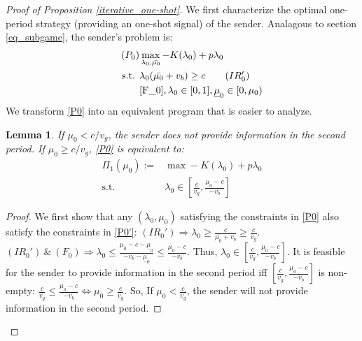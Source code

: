 \documentclass[11pt]{extarticle}
\newtheorem{lemma}{Lemma}
\newcommand{\lra}{\Leftrightarrow}
\newcommand{\ra}{\Rightarrow}
\begin{document}
\begin{proof}[Proof of Proposition \ref{iterative_one-shot}]
	We first characterize the optimal one-period strategy (providing an one-shot signal) of the sender. Analagous to section \ref{eq_subgame}, the sender's problem is:
	\begin{align}\tag{$P_0$} \label{P0}
	& \max\limits_{\lambda_0, \bar{\mu_0}} -K(\lambda_0) + p \lambda_0 \nonumber\\
	\text{s.t. } &\lambda_0 (\bar{\mu_0} + v_b) \geq c \tag{$IR_0'$}\\
	&\eqref{F_0}, \lambda_0 \in [0,1],\underline{\mu}_0  \in [0,\mu_0) \nonumber
	\end{align}
	We transform \eqref{P0} into an equivalent program that is easier to analyze.
	
	\begin{lemma}\label{trans}
		If $\mu_0 < c/v_g$, the sender does not provide information in the second period. If $\mu_0 \geq c/v_g$, \eqref{P0} is equivalent to:
		\begin{align}\tag{$P'_0$} \label{P0'}
		\Pi_1(\mu_0) := & \max -K(\lambda_0) + p \lambda_0 \nonumber\\
		\text{s.t. } &\lambda_0 \in \left[\frac{c}{v_g}, \frac{\mu_0-c}{-v_b}\right] \nonumber
		\end{align}
	\end{lemma}
	\begin{proof}
		We first show that any $(\lambda_0,\mu_0)$ satisfying the constraints in \eqref{P0} also satisfy the constraints in \eqref{P0'}:
		$(IR_0') \ra \lambda_0 \geq \frac{c}{\bar{\mu_0}+v_b} \geq \frac{c}{v_g}$. $(IR_0')~\&~(F_0) \ra \lambda_0 \leq \frac{\mu_0-c-\underline{\mu}_0}{-v_b-\underline{\mu}_0}\leq \frac{\mu_0-c}{-v_b}$. Thus, $\lambda_0 \in \left[\frac{c}{v_g}, \frac{\mu_0-c}{-v_b}\right]$. It is feasible for the sender to provide information in the second period iff $\left[\frac{c}{v_g}, \frac{\mu_0-c}{-v_b}\right]$ is non-empty: $\frac{c}{v_g} \leq \frac{\mu_0-c}{-v_b} \lra \mu_0 \geq \frac{c}{v_g}$. So, If $\mu_0 < \frac{c}{v_g}$, the sender will not provide information in the second period.
		

\end{proof}
\end{proof}
\end{document}
